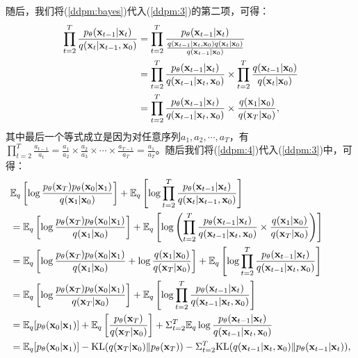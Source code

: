 \documentclass[11pt,a4paper,UTF8]{ctexart}
\begin{document}
随后，我们将(\ref{ddpm:bayes})代入(\ref{ddpm:3})的第二项，可得：
\begin{align}
\begin{split}
    \prod_{t=2}^T \frac{p_{\theta}(\mathbf{x}_{t-1}|\mathbf{x}_t)}{q(\mathbf{x}_t|\mathbf{x}_{t-1},\mathbf{x}_0)} &= \prod_{t=2}^T \frac{p_{\theta}(\mathbf{x}_{t-1}|\mathbf{x}_t)}{\frac{q(\mathbf{x}_{t-1}|\mathbf{x}_t,\mathbf{x}_0)q(\mathbf{x}_t|\mathbf{x}_0)}{q(\mathbf{x}_{t-1}|\mathbf{x}_0)}} \\
    &= \prod_{t=2}^T \frac{p_{\theta}(\mathbf{x}_{t-1}|\mathbf{x}_t)}{q(\mathbf{x}_{t-1}|\mathbf{x}_t,\mathbf{x}_0)}  \times \prod_{t=2}^T \frac{q(\mathbf{x}_{t-1}|\mathbf{x}_0)}{q(\mathbf{x}_t|\mathbf{x}_0)} \\
    &= \prod_{t=2}^T \frac{p_{\theta}(\mathbf{x}_{t-1}|\mathbf{x}_t)}{q(\mathbf{x}_{t-1}|\mathbf{x}_t,\mathbf{x}_0)}  \times \frac{q(\mathbf{x}_1|\mathbf{x}_0)}{q(\mathbf{x}_T|\mathbf{x}_0)},
\end{split}
\label{ddpm:4}
\end{align}
其中最后一个等式成立是因为对任意序列$a_1,a_2,\cdots,a_T$，有$\prod_{t=2}^T\frac{a_{t-1}}{a_t}=\frac{a_1}{a_2}\times\frac{a_2}{a_3}\times\cdots\times\frac{a_{T-1}}{a_T}=\frac{a_1}{a_T}$。随后我们将(\ref{ddpm:4})代入(\ref{ddpm:3})中，可得：
\begin{align}
\begin{split}
    & \mathbb{E}_q \left[\log\frac{p_{\theta}(\mathbf{x}_T)p_{\theta}(\mathbf{x}_0|\mathbf{x}_1)}{q(\mathbf{x}_1|\mathbf{x}_0)} \right] + \mathbb{E}_q \left[\log \prod_{t=2}^T \frac{p_{\theta}(\mathbf{x}_{t-1}|\mathbf{x}_t)}{q(\mathbf{x}_t|\mathbf{x}_{t-1},\mathbf{x}_0)} \right] \\
    &= \mathbb{E}_q \left[\log\frac{p_{\theta}(\mathbf{x}_T)p_{\theta}(\mathbf{x}_0|\mathbf{x}_1)}{q(\mathbf{x}_1|\mathbf{x}_0)} \right] + \mathbb{E}_q \left[\log \left(\prod_{t=2}^T \frac{p_{\theta}(\mathbf{x}_{t-1}|\mathbf{x}_t)}{q(\mathbf{x}_{t-1}|\mathbf{x}_t,\mathbf{x}_0)}  \times \frac{q(\mathbf{x}_1|\mathbf{x}_0)}{q(\mathbf{x}_T|\mathbf{x}_0)}\right) \right] \\
    &=\mathbb{E}_q \left[\log\frac{p_{\theta}(\mathbf{x}_T)p_{\theta}(\mathbf{x}_0|\mathbf{x}_1)}{q(\mathbf{x}_1|\mathbf{x}_0)} + \log \frac{q(\mathbf{x}_1|\mathbf{x}_0)}{q(\mathbf{x}_T|\mathbf{x}_0)} \right] + \mathbb{E}_q \left[\log \prod_{t=2}^T \frac{p_{\theta}(\mathbf{x}_{t-1}|\mathbf{x}_t)}{q(\mathbf{x}_{t-1}|\mathbf{x}_t,\mathbf{x}_0)}  \right] \\
    &= \mathbb{E}_q \left[\log\frac{p_{\theta}(\mathbf{x}_T)p_{\theta}(\mathbf{x}_0|\mathbf{x}_1)}{q(\mathbf{x}_T|\mathbf{x}_0)} \right] + \mathbb{E}_q \left[\log \prod_{t=2}^T \frac{p_{\theta}(\mathbf{x}_{t-1}|\mathbf{x}_t)}{q(\mathbf{x}_{t-1}|\mathbf{x}_t,\mathbf{x}_0)}  \right] \\
    &= \mathbb{E}_q [p_{\theta}(\mathbf{x}_0|\mathbf{x}_1)] + \mathbb{E}_q\left[\frac{p_{\theta}(\mathbf{x}_T)}{q(\mathbf{x}_T|\mathbf{x}_0)}\right] + \Sigma_{t=2}^T \mathbb{E}_q \log \frac{p_{\theta}(\mathbf{x}_{t-1}|\mathbf{x}_t)}{q(\mathbf{x}_{t-1}|\mathbf{x}_t,\mathbf{x}_0)} \\
    &= \mathbb{E}_q [p_{\theta}(\mathbf{x}_0|\mathbf{x}_1)] -\text{KL}(q(\mathbf{x}_T|\mathbf{x}_0)\| p_{\theta}(\mathbf{x}_T)) -  \Sigma_{t=2}^T \text{KL}(q(\mathbf{x}_{t-1}|\mathbf{x}_t,\mathbf{x}_0) \| p_{\theta}(\mathbf{x}_{t-1}|\mathbf{x}_t)),
\end{split}
\label{ddpm:5}
\end{align}
\end{document}
